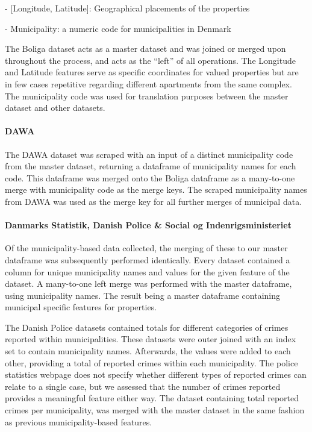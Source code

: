 \documentclass[12pt,a4paper]{article}
\begin{document}
-	[Longitude, Latitude]: Geographical placements of the properties

-	Municipality: a numeric code for municipalities in Denmark

The Boliga dataset acts as a master dataset and was joined or merged upon throughout the process, and acts as the “left” of all operations. The Longitude and Latitude features serve as specific coordinates for valued properties but are in few cases repetitive regarding different apartments from the same complex. The municipality code was used for translation purposes between the master dataset and other datasets.  

\paragraph{DAWA\newline}
The DAWA dataset was scraped with an input of a distinct municipality code from the master dataset, returning a dataframe of municipality names for each code. This dataframe was merged onto the Boliga dataframe as a many-to-one merge with municipality code as the merge keys. The scraped municipality names from DAWA was used as the merge key for all further merges of municipal data. 

\paragraph{Danmarks Statistik, Danish Police \& Social og Indenrigsministeriet\newline}
Of the municipality-based data collected, the merging of these to our master dataframe was subsequently performed identically. Every dataset contained a column for unique municipality names and values for the given feature of the dataset. A many-to-one left merge was performed with the master dataframe, using municipality names. The result being a master dataframe containing municipal specific features for properties. 

The Danish Police datasets contained totals for different categories of crimes reported within municipalities. These datasets were outer joined with an index set to contain municipality names. Afterwards, the values were added to each other, providing a total of reported crimes within each municipality. The police statistics webpage does not specify whether different types of reported crimes can relate to a single case, but we assessed that the number of crimes reported provides a meaningful feature either way. The dataset containing total reported crimes per municipality, was merged with the master dataset in the same fashion as previous municipality-based features. 
\end{document}
